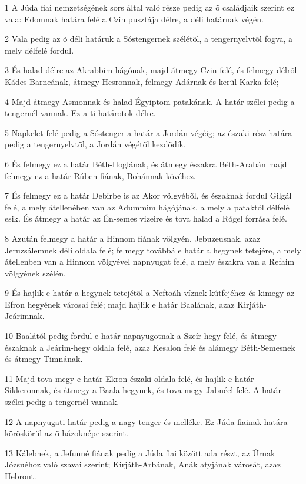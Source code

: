 \par 1 A Júda fiai nemzetségének sors által való része pedig az õ családjaik szerint ez vala: Edomnak határa felé a Czin pusztája délre, a déli határnak végén.
\par 2 Vala pedig az õ déli határuk a Sóstengernek szélétõl, a tengernyelvtõl fogva, a mely délfelé fordul.
\par 3 És halad délre az Akrabbim hágónak, majd átmegy Czin felé, és felmegy délrõl Kádes-Barneának, átmegy Hesronnak, felmegy Adárnak és kerül Karka felé;
\par 4 Majd átmegy Asmonnak és halad Égyiptom patakának. A határ szélei pedig a tengernél vannak. Ez a ti határotok délre.
\par 5 Napkelet felé pedig a Sóstenger a határ a Jordán végéig; az északi rész határa pedig a tengernyelvtõl, a Jordán végétõl kezdõdik.
\par 6 És felmegy ez a határ Béth-Hoglának, és átmegy északra Béth-Arabán majd felmegy ez a határ Rúben fiának, Bohánnak kövéhez.
\par 7 És felmegy ez a határ Debirbe is az Akor völgyébõl, és északnak fordul Gilgál felé, a mely átellenében van az Adummim hágójának, a mely a pataktól délfelé esik. És átmegy a határ az Én-semes vizeire és tova halad a Rógel forrása felé.
\par 8 Azután felmegy a határ a Hinnom fiának völgyén, Jebuzeusnak, azaz Jeruzsálemnek déli oldala felé; felmegy továbbá e határ a hegynek tetejére, a mely átellenben van a Hinnom völgyével napnyugat felé, a mely északra van a Refaim völgyének szélén.
\par 9 És hajlik e határ a hegynek tetejétõl a Neftoáh víznek kútfejéhez és kimegy az Efron hegyének városai felé; majd hajlik e határ Baalának, azaz Kirjáth-Jeárimnak.
\par 10 Baalától pedig fordul e határ napnyugotnak a Szeír-hegy felé, és átmegy északnak a Jeárim-hegy oldala felé, azaz Kesalon felé és alámegy Béth-Semesnek és átmegy Timnának.
\par 11 Majd tova megy e határ Ekron északi oldala felé, és hajlik e határ Sikkeronnak, és átmegy a Baala hegynek, és tova megy Jabnéel felé. A határ szélei pedig a tengernél vannak.
\par 12 A napnyugati határ pedig a nagy tenger és melléke. Ez Júda fiainak határa köröskörül az õ házoknépe szerint.
\par 13 Kálebnek, a Jefunné fiának pedig a Júda fiai között ada részt, az Úrnak Józsuéhoz való szavai szerint; Kirjáth-Arbának, Anák atyjának városát, azaz Hebront.
